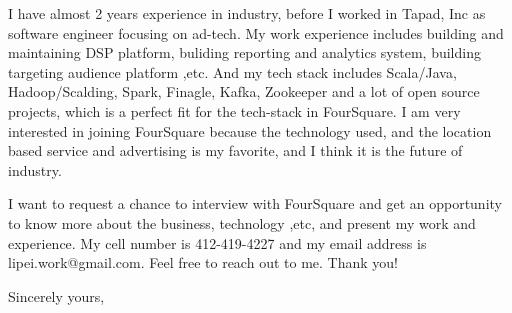\documentclass[11pt]{letter} %
\begin{document}
\begin{letter}{}
I have almost 2 years experience in industry, before I worked in Tapad, Inc as software engineer focusing on ad-tech. My work experience includes building and maintaining DSP platform, buliding reporting and analytics system, building targeting audience platform ,etc. And my tech stack includes Scala/Java, Hadoop/Scalding, Spark, Finagle, Kafka, Zookeeper and a lot of open source projects, which is a perfect fit for the tech-stack in FourSquare. I am very interested in joining FourSquare because the technology used, and the location based service and advertising is my favorite, and I think it is the future of industry. 
 
I want to request a chance to interview with FourSquare and get an opportunity to know more about the business, technology ,etc, and present my work and experience. My cell number is 412-419-4227 and my email address is lipei.work@gmail.com. Feel free to reach out to me. Thank you! 


\closing{Sincerely yours,}




\end{letter}
\end{document}
